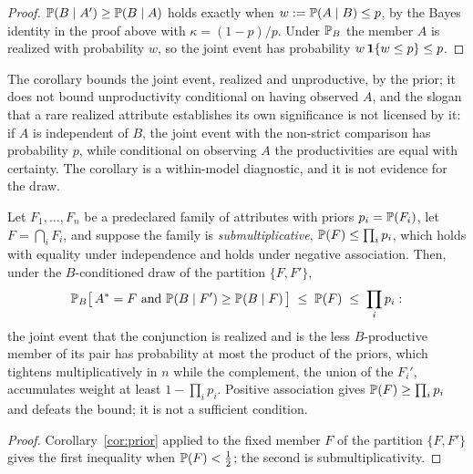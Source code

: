 \begin{proof}
$\mathbb{P}(B\mid A')\ge\mathbb{P}(B\mid A)$ holds exactly when $w:=\mathbb{P}(A\mid B)\le p$,
by the Bayes identity in the proof above with $\kappa=(1-p)/p$. Under
$\mathbb{P}_B$ the member $A$ is realized with probability $w$, so the joint
event has probability $w\,\mathbf{1}\{w\le p\}\le p$.
\end{proof}

\noindent The corollary bounds the joint event, realized and unproductive, by the prior; it does not bound unproductivity conditional on having observed $A$, and the slogan that a rare realized attribute establishes its own significance is not licensed by it: if $A$ is independent of $B$, the joint event with the non-strict comparison has probability $p$, while conditional on observing $A$ the productivities are equal with certainty. The corollary is a within-model
diagnostic, and it is not evidence for the draw.

\begin{proposition}\label{prop:stockpile}
Let $F_1,\dots,F_n$ be a predeclared family of attributes with priors
$p_i=\mathbb{P}(F_i)$, let $F=\bigcap_iF_i$, and suppose the family is
\emph{submultiplicative}, $\mathbb{P}(F)\le\prod_ip_i$, which holds with
equality under independence and holds under negative association. Then,
under the $B$-conditioned draw of the partition $\{F,F'\}$,
\begin{equation}\label{eq:stockpile}
\mathbb{P}_B\bigl[\,A^\ast=F\ \text{and}\ \mathbb{P}(B\mid F')\ge\mathbb{P}(B\mid F)\,\bigr]
\;\le\;\mathbb{P}(F)\;\le\;\prod_ip_i:
\end{equation}
the joint event that the conjunction is realized and is the less
$B$-productive member of its pair has probability at most the product
of the priors, which tightens multiplicatively in $n$ while the
complement, the union of the $F_i'$, accumulates weight at least $1-\prod_ip_i$.
Positive association gives $\mathbb{P}(F)\ge\prod_ip_i$ and defeats the bound;
it is not a sufficient condition.
\end{proposition}

\begin{proof}
Corollary~\ref{cor:prior} applied to the fixed member $F$ of the
partition $\{F,F'\}$ gives the first inequality when $\mathbb{P}(F)<\tfrac12$;
the second is submultiplicativity.
\end{proof}

